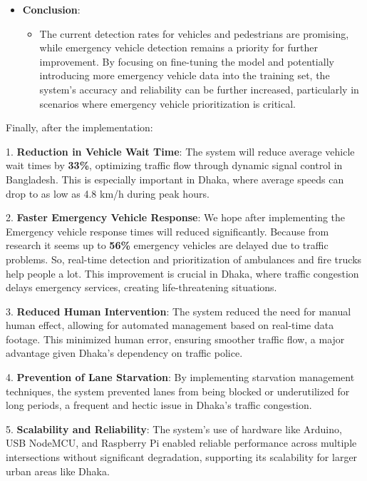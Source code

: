 \documentclass[usenatbib]{tjaa}
\begin{document}
\begin{itemize}
    \item \textbf{Conclusion}:
    \begin{itemize}
        \item The current detection rates for vehicles and pedestrians are promising, while emergency vehicle detection remains a priority for further improvement. By focusing on fine-tuning the model and potentially introducing more emergency vehicle data into the training set, the system's accuracy and reliability can be further increased, particularly in scenarios where emergency vehicle prioritization is critical.
    \end{itemize}
\end{itemize}




Finally, after the implementation:

1. \textbf{Reduction in Vehicle Wait Time}:  
   The system will reduce average vehicle wait times by \textbf{33\%}, optimizing traffic flow through dynamic signal control in Bangladesh. This is especially important in Dhaka, where average speeds can drop to as low as 4.8 km/h during peak hours.

2. \textbf{Faster Emergency Vehicle Response}:  
   We hope after implementing the Emergency vehicle response times will reduced significantly. Because from research it seems up to \textbf{56\%} emergency vehicles are delayed due to traffic problems. So, real-time detection and prioritization of ambulances and fire trucks help people a lot. This improvement is crucial in Dhaka, where traffic congestion delays emergency services, creating life-threatening situations.

3. \textbf{Reduced Human Intervention}:  
   The system reduced the need for manual human effect, allowing for automated management based on real-time data footage. This minimized human error, ensuring smoother traffic flow, a major advantage given Dhaka’s dependency on traffic police.

4. \textbf{Prevention of Lane Starvation}:  
   By implementing starvation management techniques, the system prevented lanes from being blocked or underutilized for long periods, a frequent and hectic issue in Dhaka’s traffic congestion.

5. \textbf{Scalability and Reliability}:  
   The system’s use of hardware like Arduino, USB NodeMCU, and Raspberry Pi enabled reliable performance across multiple intersections without significant degradation, supporting its scalability for larger urban areas like Dhaka.
\end{document}
